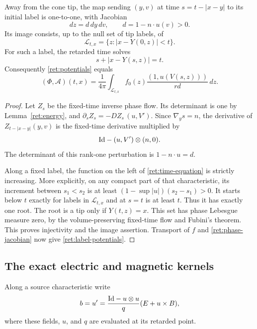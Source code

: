 \begin{lemma}\label{ret:phase-change}
Away from the cone tip, the map sending $(y,v)$ at time
$s=t-|x-y|$ to its initial label is one-to-one, with Jacobian
\begin{equation}\label{ret:phase-jacobian}
 dz=d\,dy\,dv,\qquad d=1-n\cdot u(v)>0.
\end{equation}
Its image consists, up to the null set of tip labels, of
\[
 \mathcal L_{t,x}=\{z:|x-Y(0,z)|<t\}.
\]
For such a label, the retarded time solves
\begin{equation}\label{ret:time-equation}
 s+|x-Y(s,z)|=t.
\end{equation}
Consequently \eqref{ret:potentials} equals
\begin{equation}\label{ret:label-potentials}
 (\Phi,\mathcal A)(t,x)=\frac1{4\pi}
       \int_{\mathcal L_{t,x}} f_0(z)\frac{(1,u(V(s,z)))}{rd}\,dz.
\end{equation}
\end{lemma}

\begin{proof}
Let $Z_s$ be the fixed-time inverse phase flow. Its determinant is one
by Lemma~\ref{ret:energy}, and
$\partial_sZ_s=-D Z_s\,(u,V')$. Since $\nabla_y s=n$, the derivative
of $Z_{t-|x-y|}(y,v)$ is the fixed-time derivative multiplied by
\[
 \mathrm{Id}-(u,V')\otimes(n,0).
\]
The determinant of this rank-one perturbation is $1-n\cdot u=d$.

Along a fixed label, the function on the left of
\eqref{ret:time-equation} is strictly increasing. More explicitly,
on any compact part of that characteristic, its increment between
$s_1<s_2$ is at least
$(1-\sup|u|)(s_2-s_1)>0$. It starts below $t$ exactly for labels in
$\mathcal L_{t,x}$ and at $s=t$ is at least $t$. Thus it has exactly
one root. The root is a tip only if $Y(t,z)=x$. This set has phase
Lebesgue measure zero, by the volume-preserving fixed-time flow and
Fubini's theorem. This proves injectivity and the image assertion.
Transport of $f$ and \eqref{ret:phase-jacobian} now give
\eqref{ret:label-potentials}.
\end{proof}

\subsection{The exact electric and magnetic kernels}

Along a source characteristic write
\begin{equation}\label{ret:source-acceleration}
 b=u'=\frac{\mathrm{Id}-u\otimes u}{q}(E+u\times B),
\end{equation}
where these fields, $u$, and $q$ are evaluated at its retarded point.

